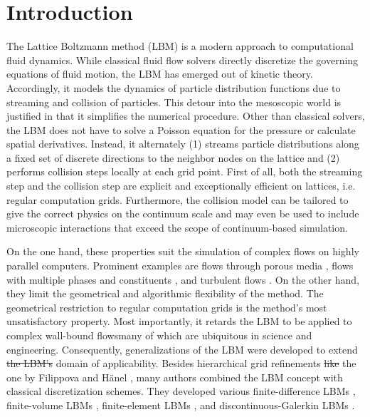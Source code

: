 \documentclass[1p, sort&compress]{elsarticle}
\providecommand{\DIFaddtex}[1]{{\protect\color{blue}\uwave{#1}}} %
\providecommand{\DIFdeltex}[1]{{\protect\color{red}\sout{#1}}}                      %
\providecommand{\DIFaddbegin}{} %
\providecommand{\DIFaddend}{} %
\providecommand{\DIFdelbegin}{} %
\providecommand{\DIFdelend}{} %
\providecommand{\DIFadd}[1]{\texorpdfstring{\DIFaddtex{#1}}{#1}} %
\providecommand{\DIFdel}[1]{\texorpdfstring{\DIFdeltex{#1}}{}} %
\newcommand{\DIFscaledelfig}{0.5}
\newlength{\DIFdelgraphicswidth} %
\newlength{\DIFdelgraphicsheight} %
\newcommand{\DIFaddincludegraphics}[2][]{{\color{blue}\fbox{\DIFOincludegraphics[#1]{#2}}}} %
\newcommand{\DIFdelincludegraphics}[2][]{%
\sbox{\DIFdelgraphicsbox}{\DIFOincludegraphics[#1]{#2}}%
\settoboxwidth{\DIFdelgraphicswidth}{\DIFdelgraphicsbox} %
\settoboxtotalheight{\DIFdelgraphicsheight}{\DIFdelgraphicsbox} %
\scalebox{\DIFscaledelfig}{%
\parbox[b]{\DIFdelgraphicswidth}{\usebox{\DIFdelgraphicsbox}\\[-\baselineskip] \rule{\DIFdelgraphicswidth}{0em}}\llap{\resizebox{\DIFdelgraphicswidth}{\DIFdelgraphicsheight}{%
\setlength{\unitlength}{\DIFdelgraphicswidth}%
\begin{picture}(1,1)%
\thicklines\linethickness{2pt} %
{\color[rgb]{1,0,0}\put(0,0){\framebox(1,1){}}}%
{\color[rgb]{1,0,0}\put(0,0){\line( 1,1){1}}}%
{\color[rgb]{1,0,0}\put(0,1){\line(1,-1){1}}}%
\end{picture}%
}\hspace*{3pt}}} %
} %
\DeclareRobustCommand{\DIFaddbegin}{\DIFOaddbegin \let\includegraphics\DIFaddincludegraphics} %
\DeclareRobustCommand{\DIFaddend}{\DIFOaddend \let\includegraphics\DIFOincludegraphics} %
\DeclareRobustCommand{\DIFdelbegin}{\DIFOdelbegin \let\includegraphics\DIFdelincludegraphics} %
\DeclareRobustCommand{\DIFdelend}{\DIFOaddend \let\includegraphics\DIFOincludegraphics} %
\begin{document}
\section{Introduction} %

The Lattice Boltzmann method (LBM) is a modern approach to computational fluid dynamics. While classical fluid flow solvers directly discretize the governing equations of fluid motion, the LBM has emerged out of kinetic theory. Accordingly, it models the dynamics of particle distribution functions due to streaming and collision of particles. This detour into the mesoscopic world is justified in that it simplifies the numerical procedure. Other than classical solvers, the LBM does not have to solve a Poisson equation for the pressure or calculate spatial derivatives. Instead, it alternately (1) streams particle distributions along a fixed set of discrete directions to the neighbor nodes on the lattice and (2) performs collision steps locally at each grid point. First of all, both the streaming step and the collision step are explicit and exceptionally efficient on lattices, i.e. regular computation grids. Furthermore, the collision model can be tailored to give the correct physics on the continuum scale and may even be used to include microscopic interactions that exceed the scope of continuum-based simulation.

On the one hand, these properties suit the simulation of complex flows on highly parallel computers. Prominent examples are flows through porous media \DIFaddbegin \DIFadd{\mbox{%
\cite{Martys.1996}}%
}\DIFaddend , flows with multiple phases and constituents \DIFaddbegin \DIFadd{\mbox{%
\cite{Li.2016}}%
}\DIFaddend , and turbulent flows \DIFaddbegin \DIFadd{\mbox{%
\cite{Jahanshaloo.2013}}%
}\DIFaddend . On the other hand, they limit the geometrical and algorithmic flexibility of the method. The geometrical restriction to regular computation grids is the method's most unsatisfactory property. Most importantly, it retards the LBM to be applied to complex wall-bound flows\DIFaddbegin \DIFadd{, }\DIFaddend many of which are ubiquitous in science and engineering. Consequently, generalizations of the LBM were developed to extend \DIFdelbegin \DIFdel{the LBM's }\DIFdelend \DIFaddbegin \DIFadd{its }\DIFaddend domain of applicability. Besides hierarchical grid refinements \DIFdelbegin \DIFdel{like }\DIFdelend \DIFaddbegin \DIFadd{such as }\DIFaddend the one by Filippova and H{\"a}nel \cite{Filippova.1998}, many authors combined the LBM concept with classical discretization schemes. They developed various finite-difference LBMs \cite{Fakhari.2015,Hejranfar.2014}, finite-volume LBMs \cite{Patil.2009,StefanoUbertini.2008}, finite-element LBMs \cite{Duster.2006,Li.2005}, and discontinuous-Galerkin LBMs \cite{Zadehgol.2014,Min.2011}.
\end{document}

